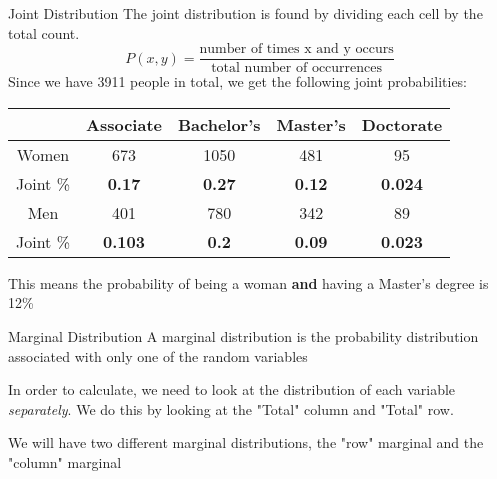 \documentclass{beamer}
\begin{document}
\begin{frame}{Joint Distribution}
	The joint distribution is found by dividing each cell by the total count.
	$$P(x,y)=\frac{\text{number of times x and y occurs}}{\text{total number of occurrences}}$$
	Since we have 3911 people in total, we get the following joint probabilities:
	\begin{center}
		\footnotesize{
			\begin{tabular}{|c|c|c|c|c|}
				\hline
				\diagbox{Sex}{Degree} & Associate      & Bachelor's    & Master's      & Doctorate      \\
				\hline
				Women                           & 673            & 1050          & 481           & 95             \\
				Joint \%                        & \textbf{0.17}  & \textbf{0.27} & \textbf{0.12} & \textbf{0.024} \\ 
				\hline
				Men                             & 401            & 780           & 342           & 89             \\
				Joint \%                        & \textbf{0.103} & \textbf{0.2}  & \textbf{0.09} & \textbf{0.023} \\
				\hline
			\end{tabular}}
	\end{center}
	This means the probability of being a woman \textbf{and} having a Master's degree is 12\%
\end{frame}

\begin{frame}{Marginal Distribution}
	A \alert{marginal distribution} is the probability distribution associated with only one of the random variables
	
	In order to calculate, we need to look at the distribution of each variable \textit{separately}. We do this by looking at the "Total" column and "Total" row.
	 
	We will have two different marginal distributions, the "row" marginal and the "column" marginal
\end{frame}
\end{document}
